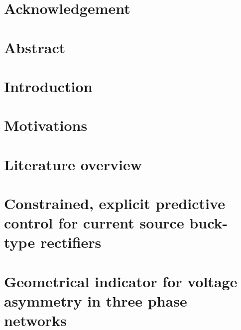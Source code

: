 \documentclass[12pt, a4paper, oneside, table]{report}
\begin{document}

 \null
 \thispagestyle{empty}%
 \addtocounter{page}{-1}%
 \newpage

 

 

 \chapter*{Acknowledgement}
 


 \chapter*{Abstract}
 

 \thispagestyle{plain}
 \tableofcontents
 \newpage

\chapter{Introduction}
 

 \chapter{Motivations}
 

 \chapter{Literature overview}
 

 \chapter{Constrained, explicit predictive control for current source buck-type rectifiers}
 
 \chapter{Geometrical indicator for voltage asymmetry in three phase networks}
 
\end{document}
